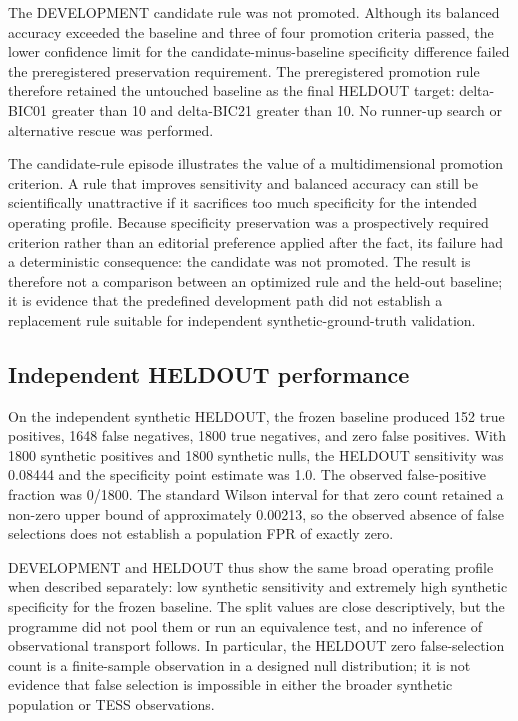 \documentclass[manuscript,linenumbers]{aastex702}
\begin{document}
The DEVELOPMENT candidate rule was not promoted. Although its balanced accuracy exceeded the baseline and three of four promotion criteria passed, the lower confidence limit for the candidate-minus-baseline specificity difference failed the preregistered preservation requirement. The preregistered promotion rule therefore retained the untouched baseline as the final HELDOUT target: delta-BIC01 greater than 10 and delta-BIC21 greater than 10. No runner-up search or alternative rescue was performed.

The candidate-rule episode illustrates the value of a multidimensional promotion criterion. A rule that improves sensitivity and balanced accuracy can still be scientifically unattractive if it sacrifices too much specificity for the intended operating profile. Because specificity preservation was a prospectively required criterion rather than an editorial preference applied after the fact, its failure had a deterministic consequence: the candidate was not promoted. The result is therefore not a comparison between an optimized rule and the held-out baseline; it is evidence that the predefined development path did not establish a replacement rule suitable for independent synthetic-ground-truth validation.

\subsection{Independent HELDOUT performance}
On the independent synthetic HELDOUT, the frozen baseline produced 152 true positives, 1648 false negatives, 1800 true negatives, and zero false positives. With 1800 synthetic positives and 1800 synthetic nulls, the HELDOUT sensitivity was 0.08444 and the specificity point estimate was 1.0. The observed false-positive fraction was 0/1800. The standard Wilson interval for that zero count retained a non-zero upper bound of approximately 0.00213, so the observed absence of false selections does not establish a population FPR of exactly zero.

DEVELOPMENT and HELDOUT thus show the same broad operating profile when described separately: low synthetic sensitivity and extremely high synthetic specificity for the frozen baseline. The split values are close descriptively, but the programme did not pool them or run an equivalence test, and no inference of observational transport follows. In particular, the HELDOUT zero false-selection count is a finite-sample observation in a designed null distribution; it is not evidence that false selection is impossible in either the broader synthetic population or TESS observations.
\end{document}
